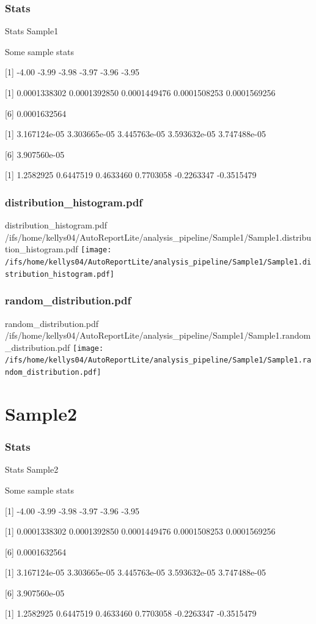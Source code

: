 \documentclass[8pt]{beamer}\usepackage[]{graphicx}\usepackage[]{color}
\begin{document}
\subsubsection{Stats}
\begin{frame}{Stats }
Sample1 

Some sample stats

[1] -4.00 -3.99 -3.98 -3.97 -3.96 -3.95

[1] 0.0001338302 0.0001392850 0.0001449476 0.0001508253 0.0001569256

[6] 0.0001632564

[1] 3.167124e-05 3.303665e-05 3.445763e-05 3.593632e-05 3.747488e-05

[6] 3.907560e-05

[1]  1.2582925  0.6447519  0.4633460  0.7703058 -0.2263347 -0.3515479
\scriptsize{}
\end{frame}

\subsubsection{distribution\_histogram.pdf}
\begin{frame}{distribution\_histogram.pdf }
\scriptsize{/ifs/home/kellys04/AutoReportLite/analysis\_pipeline/Sample1/Sample1.distribution\_histogram.pdf}
\texttt{[image: /ifs/home/kellys04/AutoReportLite/analysis\_pipeline/Sample1/Sample1.distribution\_histogram.pdf]}
\end{frame}

\subsubsection{random\_distribution.pdf}
\begin{frame}{random\_distribution.pdf }
\scriptsize{/ifs/home/kellys04/AutoReportLite/analysis\_pipeline/Sample1/Sample1.random\_distribution.pdf}
\texttt{[image: /ifs/home/kellys04/AutoReportLite/analysis\_pipeline/Sample1/Sample1.random\_distribution.pdf]}
\end{frame}

\section{Sample2}
\subsubsection{Stats}
\begin{frame}{Stats }
Sample2 

Some sample stats

[1] -4.00 -3.99 -3.98 -3.97 -3.96 -3.95

[1] 0.0001338302 0.0001392850 0.0001449476 0.0001508253 0.0001569256

[6] 0.0001632564

[1] 3.167124e-05 3.303665e-05 3.445763e-05 3.593632e-05 3.747488e-05

[6] 3.907560e-05

[1]  1.2582925  0.6447519  0.4633460  0.7703058 -0.2263347 -0.3515479
\scriptsize{}
\end{frame}
\end{document}

